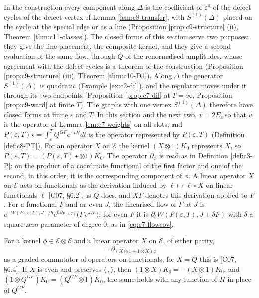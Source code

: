 In the construction every component along $\Delta$ is the coefficient of $\varepsilon^0$ of the defect cycles of the defect vertex of Lemma \ref{lem:c8-transfer}, with $S^{(1)}(\Delta)$ placed on the cycle at the special edge or as a line (Proposition \ref{prop:c9-structure} (ii), Theorem \ref{thm:c11-classes}). The closed forms of this section serve two purposes: they give the line placement, the composite kernel, and they give a second evaluation of the same flow, through $Q$ of the renormalised amplitudes, whose agreement with the defect cycles is a theorem of the construction (Proposition \ref{prop:c9-structure} (iii), Theorem \ref{thm:c10-D1}). Along $\Delta$ the generator $S^{(1)}(\Delta)$ is quadratic (Example \ref{ex:c2-dil}), and the regulator moves under it through its two endpoints (Proposition \ref{prop:c7-dil} at $T=\infty$, Proposition \ref{prop:c9-ward} at finite $T$). The graphs with one vertex $S^{(1)}(\Delta)$ therefore have closed forms at finite $\varepsilon$ and $T$. In this section and the next two, $v=2E$, so that $v.$ is the operator of Lemma \ref{lem:c7-weights} on all slots, and $P(\varepsilon,T)\star=\int_\varepsilon^TQ^{GF}e^{-tH}dt$ is the operator represented by $P(\varepsilon,T)$ (Definition \ref{def:c8-PT}). For an operator $X$ on $\mathscr E$ the kernel $(X\otimes1)K_0$ represents $X$, so $P(\varepsilon,T)=(P(\varepsilon,T)\star\otimes1)K_0$. The operator $\partial_\phi$ is read as in Definition \ref{def:c3-P}: on the product of a coordinate functional of the first factor and one of the second, in this order, it is the corresponding component of $\phi$. A linear operator $X$ on $\mathscr E$ acts on functionals as the derivation induced by $\ell\mapsto\ell\circ X$ on linear functionals $\ell$ [C07, §6.2], as $Q$ does, and $XF$ denotes this derivation applied to $F$. For a functional $F$ and an even $J$, the linearised flow of $F$ at $J$ is $e^{-W(P(\varepsilon,T),J)/\hbar}e^{\hbar\partial_{P(\varepsilon,T)}}\big(F\,e^{J/\hbar}\big)$; for even $F$ it is $\partial_\delta W(P(\varepsilon,T),J+\delta F)$ with $\delta$ a square-zero parameter of degree $0$, as in \eqref{eq:c7-flowcov}.

\begin{lemma}
\label{lem:c9-ops}
For a kernel $\phi\in\mathscr E\otimes\mathscr E$ and a linear operator $X$ on $\mathscr E$, of either parity,
\begin{equation}
[\partial_\phi,X]=\partial_{(X\otimes1+1\otimes X)\phi}
\label{eq:c9-commutator}
\end{equation}
as a graded commutator of operators on functionals; for $X=Q$ this is [C07, §6.4]. If $X$ is even and preserves $\langle\,,\rangle$, then $(1\otimes X)K_0=-(X\otimes1)K_0$, and $(1\otimes Q^{GF})K_0=(Q^{GF}\otimes1)K_0$; the same holds with any function of $H$ in place of $Q^{GF}$.
\end{lemma}

